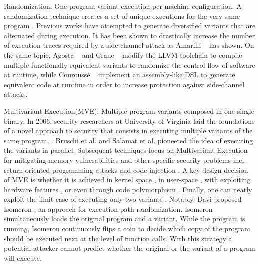 \begin{usage}{Randomization:}
    \label{usage:randomization}
    \normalfont
    One program variant execution per machine configuration. 
    A randomization technique creates a set of unique executions for the very same program \cite{bhatkar03}. 
    Previous works have attempted to generate diversified variants that are alternated during execution.
    It has been shown to drastically increase the number of execution traces required by a side-channel attack as
    Amarilli \etal~\cite{amarilli2011can} has shown. On the same topic,
    Agosta \etal~\cite{agosta2015meet} and Crane \etal~\cite{crane2015thwarting}
    modify the LLVM toolchain to compile multiple functionally equivalent variants to randomize the control flow of software at runtime,
    while Courouss{\'e} \etal~\cite{courousse2016runtime} implement an assembly-like DSL to generate equivalent code at runtime in order to increase protection against side-channel attacks. 
\end{usage}

\begin{usage}{Multivariant Execution(MVE):}
    \label{usage:mve}
    \normalfont
    Multiple program variants composed in one single binary. In 2006, security researchers at University of Virginia laid the foundations of a novel approach to security that consists in executing multiple variants of the same program, \cite{cox06}. Bruschi et al. \cite{bruschi2007diversified} and Salamat et al. \cite{salamat2007stopping} pioneered the idea of executing the variants in parallel. Subsequent techniques focus on Multivariant Execution for mitigating memory vulnerabilities \cite{lu2018stopping} and other specific security problems incl. return-oriented programming attacks \cite{volckaert2015cloning} and code injection \cite{SalamatJWWF11}. A key design decision of MVE is whether it is achieved in kernel space \cite{osterlund2019kmvx}, in user-space \cite{salamat2009orchestra}, with exploiting hardware features \cite{koning2016secure}, or even through code polymorphism \cite{10.1145/3281662}. Finally, one can neatly exploit the limit case of executing only two variants \cite{maurer2012tachyon,Kim2015}. Notably,  Davi \etal proposed Isomeron \cite{davi2015isomeron}, an approach  for execution-path randomization. Isomeron simultaneously loads the original program and a variant. While the program is running, Isomeron continuously flips a coin to decide which copy of the program should be executed next at the level of function calls. With this strategy a potential attacker cannot predict whether the original or the variant of a program will execute.
\end{usage}


